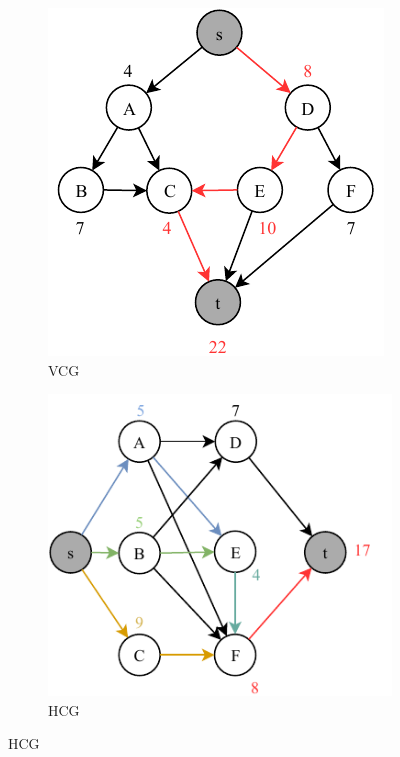 \documentclass[a4paper, 10pt]{article}
\begin{document}
\begin{figure}[H]
    \centering
    \begin{subfigure}{0.4\textwidth}
        \centering
        \includegraphics[width=1\linewidth]{4_vcg.pdf}
        \caption{VCG}
        \label{}
    \end{subfigure}
    \hfill
    \begin{subfigure}{0.47\textwidth}
        \centering
        \includegraphics[width=1\linewidth]{4_hcg.pdf}
        \caption{HCG}
        \label{}
    \end{subfigure}
\end{figure}
\end{document}
